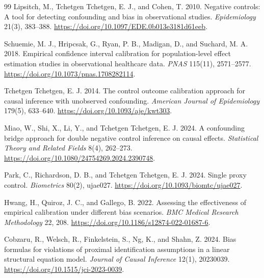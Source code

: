 \begin{thebibliography}{99}
Lipsitch, M., Tchetgen Tchetgen, E. J., and Cohen, T. 2010. Negative controls: A tool for detecting confounding and bias in observational studies. \textit{Epidemiology} 21(3), 383--388. \url{https://doi.org/10.1097/EDE.0b013e3181d61eeb}.

Schuemie, M. J., Hripcsak, G., Ryan, P. B., Madigan, D., and Suchard, M. A. 2018. Empirical confidence interval calibration for population-level effect estimation studies in observational healthcare data. \textit{PNAS} 115(11), 2571--2577. \url{https://doi.org/10.1073/pnas.1708282114}.

Tchetgen Tchetgen, E. J. 2014. The control outcome calibration approach for causal inference with unobserved confounding. \textit{American Journal of Epidemiology} 179(5), 633--640. \url{https://doi.org/10.1093/aje/kwt303}.

Miao, W., Shi, X., Li, Y., and Tchetgen Tchetgen, E. J. 2024. A confounding bridge approach for double negative control inference on causal effects. \textit{Statistical Theory and Related Fields} 8(4), 262--273. \url{https://doi.org/10.1080/24754269.2024.2390748}.

Park, C., Richardson, D. B., and Tchetgen Tchetgen, E. J. 2024. Single proxy control. \textit{Biometrics} 80(2), ujae027. \url{https://doi.org/10.1093/biomtc/ujae027}.

Hwang, H., Quiroz, J. C., and Gallego, B. 2022. Assessing the effectiveness of empirical calibration under different bias scenarios. \textit{BMC Medical Research Methodology} 22, 208. \url{https://doi.org/10.1186/s12874-022-01687-6}.

Cobzaru, R., Welsch, R., Finkelstein, S., Ng, K., and Shahn, Z. 2024. Bias formulas for violations of proximal identification assumptions in a linear structural equation model. \textit{Journal of Causal Inference} 12(1), 20230039. \url{https://doi.org/10.1515/jci-2023-0039}.


\end{thebibliography}
